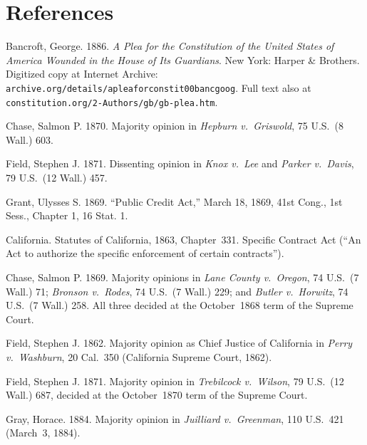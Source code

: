 \documentclass[12pt]{article}
\begin{document}
\section*{References}

\begin{description}
\setlength\itemsep{0.5em}

\item Bancroft, George. 1886. \textit{A Plea for the Constitution of the
United States of America Wounded in the House of Its Guardians}. New
York: Harper \& Brothers. Digitized copy at Internet Archive:
\texttt{archive.org/details/apleaforconstit00bancgoog}. Full text also
at \texttt{constitution.org/2-Authors/gb/gb-plea.htm}.

\item Chase, Salmon P. 1870. Majority opinion in \textit{Hepburn
v.\ Griswold}, 75 U.S.\ (8 Wall.) 603.

\item Field, Stephen J. 1871. Dissenting opinion in \textit{Knox v.\
Lee} and \textit{Parker v.\ Davis}, 79 U.S.\ (12 Wall.) 457.

\item Grant, Ulysses S. 1869. ``Public Credit Act,'' March 18, 1869,
41st Cong., 1st Sess., Chapter 1, 16 Stat. 1.

\item California. Statutes of California, 1863, Chapter~331. Specific
Contract Act (``An Act to authorize the specific enforcement of certain
contracts'').

\item Chase, Salmon P. 1869. Majority opinions in \textit{Lane County
v.\ Oregon}, 74 U.S.\ (7 Wall.) 71; \textit{Bronson v.\ Rodes}, 74 U.S.\
(7 Wall.) 229; and \textit{Butler v.\ Horwitz}, 74 U.S.\ (7 Wall.) 258.
All three decided at the October~1868 term of the Supreme Court.

\item Field, Stephen J. 1862. Majority opinion as Chief Justice of
California in \textit{Perry v.\ Washburn}, 20 Cal.\ 350 (California Supreme
Court, 1862).

\item Field, Stephen J. 1871. Majority opinion in \textit{Trebilcock
v.\ Wilson}, 79 U.S.\ (12 Wall.) 687, decided at the October~1870 term of
the Supreme Court.

\item Gray, Horace. 1884. Majority opinion in \textit{Juilliard
v.\ Greenman}, 110 U.S.\ 421 (March~3, 1884).


\end{description}
\end{document}
